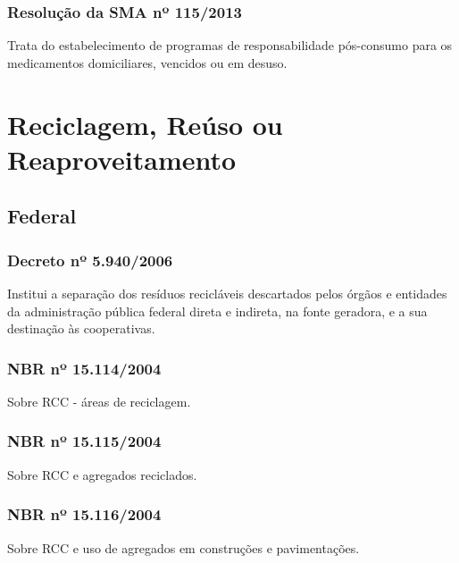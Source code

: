 \begin{subapend}
\begin{subsubapend}
		\subsubsection{Resolução da SMA nº 115/2013}
		Trata do estabelecimento de programas de responsabilidade pós-consumo para os medicamentos domiciliares, vencidos ou em desuso.
	\end{subsubapend}
\end{subapend}

\section{Reciclagem, Reúso ou Reaproveitamento}

\begin{subapend}
	\subsection{Federal}
	\begin{subsubapend}
		\item \subsubsection{Decreto nº 5.940/2006}
		Institui a separação dos resíduos recicláveis descartados pelos órgãos e entidades da administração pública federal direta e indireta, na fonte geradora, e a sua destinação às cooperativas.
		\subsubsection{NBR nº 15.114/2004}
		Sobre RCC - áreas de reciclagem.
		\subsubsection{NBR nº 15.115/2004}
		Sobre RCC e agregados reciclados.
		\subsubsection{NBR nº 15.116/2004}
		Sobre RCC e uso de agregados em construções e pavimentações.
	\end{subsubapend}
\end{subapend}



